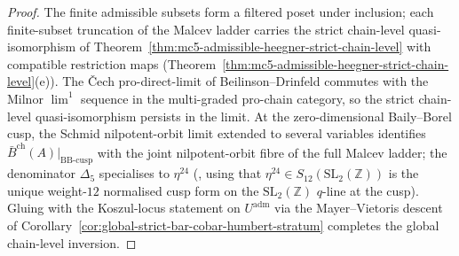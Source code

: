 \begin{proof}
The finite admissible subsets form a filtered poset under inclusion;
each finite-subset truncation of the Malcev ladder carries the strict
chain-level quasi-isomorphism of
Theorem~\textup{\ref{thm:mc5-admissible-heegner-strict-chain-level}}
with compatible restriction maps
(Theorem~\textup{\ref{thm:mc5-admissible-heegner-strict-chain-level}}(e)).
The \v Cech pro-direct-limit of Beilinson--Drinfeld
\cite[\S 5.8]{BeilinsonDrinfeld2004} commutes with the Milnor
$\lim^1$ sequence in the multi-graded pro-chain category, so the
strict chain-level quasi-isomorphism persists in the limit. At the
zero-dimensional Baily--Borel cusp, the Schmid nilpotent-orbit limit
\cite[\S 5]{Schmid1973} extended to several variables
\cite[\S 4]{CattaniKaplanSchmid1986} identifies
$\bar B^{\mathrm{ch}}(A)|_{\mathrm{BB\text{-}cusp}}$ with the joint
nilpotent-orbit fibre of the full Malcev ladder; the denominator
$\Delta_5$ specialises to $\eta^{24}$
(\cite[\S 3]{GritsenkoNikulin1998}, using that
$\eta^{24}\in S_{12}(\mathrm{SL}_2(\mathbb Z))$ is the unique
weight-$12$ normalised cusp form on the $\mathrm{SL}_2(\mathbb Z)$
$q$-line at the cusp). Gluing with the Koszul-locus statement on
$U^{\mathrm{adm}}$ via the Mayer--Vietoris descent of
Corollary~\textup{\ref{cor:global-strict-bar-cobar-humbert-stratum}}
completes the global chain-level inversion.
\end{proof}

